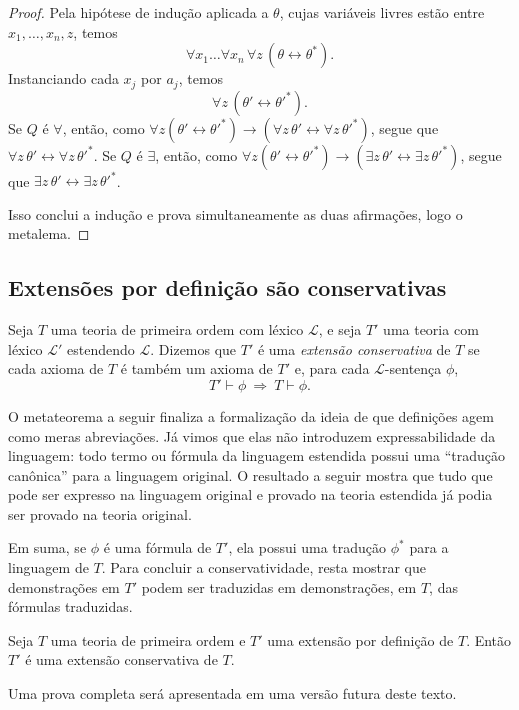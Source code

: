 \begin{proof}
    Pela hipótese de indução aplicada a $\theta$, cujas variáveis livres estão entre
    $x_1,\ldots,x_n,z$, temos
    \[
        \forall x_1\ldots \forall x_n\,\forall z\,(\theta\leftrightarrow \theta^\ast).
    \]
    Instanciando cada $x_j$ por $a_j$, temos
    \[
        \forall z\,(\theta'\leftrightarrow \theta'^\ast).
    \]
    Se $Q$ é $\forall$, então, como $\forall z(\theta'\leftrightarrow \theta'^\ast)\rightarrow (\forall z\,\theta'\leftrightarrow \forall z\,\theta'^\ast)$, segue que $\forall z\,\theta'\leftrightarrow \forall z\,\theta'^\ast$.
    Se $Q$ é $\exists$, então, como $\forall z(\theta'\leftrightarrow \theta'^\ast)\rightarrow (\exists z\,\theta'\leftrightarrow \exists z\,\theta'^\ast)$, segue que $\exists z\,\theta'\leftrightarrow \exists z\,\theta'^\ast$.

    \smallskip
    Isso conclui a indução e prova simultaneamente as duas afirmações, logo o metalema.
\end{proof}

\subsection{Extensões por definição são conservativas}\label{subsec:extensoesPorDefinicaoSaoConservativas}

\begin{metadefinition}\label{mdef:extensaoConservativa}
    Seja $T$ uma teoria de primeira ordem com léxico $\mathcal L$, e seja $T'$ uma teoria com léxico $\mathcal L'$ estendendo $\mathcal L$.
    Dizemos que $T'$ é uma \emph{extensão conservativa} de $T$ se cada axioma de $T$ é também um axioma de $T'$ e, para cada $\mathcal L$-sentença $\phi$,
    \[
        T'\vdash \phi \ \Longrightarrow\ T\vdash \phi.
    \]
\end{metadefinition}

O metateorema a seguir finaliza a formalização da ideia de que definições agem como meras abreviações.
Já vimos que elas não introduzem expressabilidade da linguagem: todo termo ou fórmula da linguagem estendida possui uma ``tradução canônica'' para a linguagem original.
O resultado a seguir mostra que tudo que pode ser expresso na linguagem original e provado na teoria estendida já podia ser provado na teoria original.

Em suma, se $\phi$ é uma fórmula de $T'$, ela possui uma tradução $\phi^\ast$ para a linguagem de $T$.
Para concluir a conservatividade, resta mostrar que demonstrações em $T'$ podem ser traduzidas em demonstrações, em $T$, das fórmulas traduzidas.

\begin{metatheorem}\label{mthm:conservatividadeDaExtensaoPorDefinicao}
    Seja $T$ uma teoria de primeira ordem e $T'$ uma extensão por definição de $T$.
    Então $T'$ é uma extensão conservativa de $T$.
\end{metatheorem}

Uma prova completa será apresentada em uma versão futura deste texto.